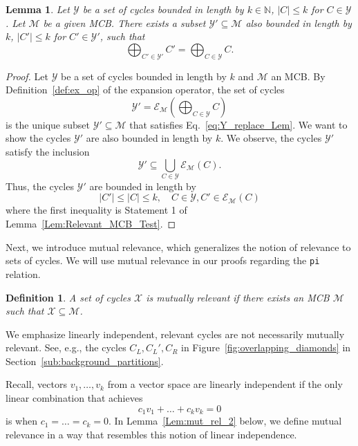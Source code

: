 \documentclass[fleqn,11pt]{article}
\newtheorem{definition}{Definition}
\newtheorem{lemma}[theorem]{Lemma}
\newcommand\calM{\mathcal{M}}
\newcommand\calY{\mathcal{Y}}
\newcommand\expand[2]{\mathcal{E}_{#1}\left(#2\right)}   %
\begin{document}
\begin{lemma}
	Let $\calY$ be a set of cycles bounded in length by $k\in\mathbb{N}$, $|C|\le k$ for $C\in\calY$. Let $\calM$ be a given MCB. There exists a subset $\calY'\subseteq\calM$ also bounded in length by $k$, $|C'|\le k$ for $C'\in\calY'$, such that
	\begin{equation}
		\bigoplus_{C'\in\calY'}C' = \bigoplus_{C\in\calY}C.
		\label{eq:Y_replace_Lem}
	\end{equation}
	\label{Lem:SmallCycs2MCB}
\end{lemma}
\begin{proof}
	Let $\calY$ be a set of cycles bounded in length by $k$ and $\calM$ an MCB. By Definition~\ref{def:ex_op} of the expansion operator, the set of cycles
	\begin{equation}
		\calY' = \expand{\calM}{\bigoplus_{C\in\calY} C}
	\end{equation}
	is the unique subset $\calY'\subseteq\calM$ that satisfies Eq.~\eqref{eq:Y_replace_Lem}. We want to show the cycles $\calY'$ are also bounded in length by $k$. We observe, the cycles $\calY'$ satisfy the inclusion
	\begin{equation}
		\calY' \subseteq \bigcup_{{C\in\calY}} \expand{\calM}{C}.
	\end{equation}
	Thus, the cycles $\calY'$ are bounded in length by
	\begin{equation}
		|C'|\le|C|\le k, \quad C\in\calY,C'\in\expand{\calM}{C}
	\end{equation}
	where the first inequality is Statement 1 of Lemma~\ref{Lem:Relevant_MCB_Test}.
\end{proof}

Next, we introduce mutual relevance, which generalizes the notion of relevance to sets of cycles. We will use mutual relevance in our proofs regarding the {\tt pi} relation.

\begin{definition}
	A set of cycles $\mathcal{X}$ is \emph{mutually relevant} if there exists an MCB $\calM$ such that $\mathcal{X}\subseteq\calM$.
	\label{def:mut_rel}
\end{definition}

\noindent We emphasize linearly independent, relevant cycles are not necessarily mutually relevant. See, e.g., the cycles $C_L,C_L',C_R$ in Figure~\ref{fig:overlapping_diamonds} in Section~\ref{sub:background_partitions}.%

Recall, vectors $v_1,\hdots,v_k$ from a vector space are linearly independent if the only linear combination that achieves
\begin{equation*}
	c_1v_1+\hdots +c_kv_k=0
\end{equation*}
is when $c_1=\hdots=c_k=0$. In Lemma~\ref{Lem:mut_rel_2} below, we define mutual relevance in a way that resembles this notion of linear independence. 
\end{document}
